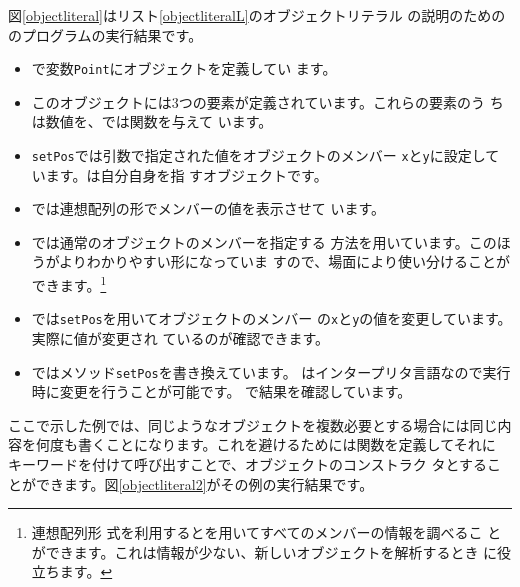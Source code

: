 図\ref{objectliteral}はリスト\ref{objectliteralL}のオブジェクトリテラル
の説明のための\JS のプログラムの実行結果です。


\begin{itemize}
 \item {}で変数\texttt{Point}にオブジェクトを定義してい
       ます。
 \item このオブジェクトには3つの要素が定義されています。これらの要素のう
       ちは数値を、では関数を与えて
       います。
 \item \texttt{setPos}では引数で指定された値をオブジェクトのメンバー
       \texttt{x}と\texttt{y}に設定しています。は自分自身を指
       すオブジェクトです。
 \item {}では連想配列の形でメンバーの値を表示させて
       います。
 \item {}では通常のオブジェクトのメンバーを指定する
       方法を用いています。このほうがよりわかりやすい形になっていま
       すので、場面により使い分けることができます。\footnote{連想配列形
       式を利用するとを用いてすべてのメンバーの情報を調べるこ
       とができます。これは情報が少ない、新しいオブジェクトを解析するとき
       に役立ちます。}
 \item {}では\texttt{setPos}を用いてオブジェクトのメンバー
       の\texttt{x}と\texttt{y}の値を変更しています。実際に値が変更され
       ているのが確認できます。
 \item {}ではメソッド\texttt{setPos}を書き換えています。
       \JS はインタープリタ言語なので実行時に変更を行うことが可能です。
       で結果を確認しています。       
\end{itemize}
ここで示した例では、同じようなオブジェクトを複数必要とする場合には同じ内
容を何度も書くことになります。これを避けるためには関数を定義してそれに
 キーワードを付けて呼び出すことで、オブジェクトのコンストラク
タとすることができます。図\ref{objectliteral2}がその例の実行結果です。
